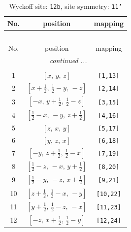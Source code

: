 \documentclass[fleqn,8pt]{jsarticle}
\begin{document}
\begin{longtable}{ccc}
\caption{Wyckoff site: {\tt 12b}, site symmetry: {\tt 11'}}
 \\
 \hline \hline
No. & position & mapping \\ \hline \endfirsthead

\multicolumn{2}{l}{\tablename\ \thetable{}} \\
 \hline \hline
No. & position & mapping \\ \hline \endhead

 \hline \hline
\multicolumn{2}{r}{\footnotesize\it continued ...} \\ \endfoot

 \hline \hline
\multicolumn{2}{r}{} \\ \endlastfoot

1 & $\left[ x,\, y,\, z \right]$ & {\tt [1,13]} \\ \hline
2 & $\left[ x + \frac{1}{2},\, \frac{1}{2} - y,\, - z \right]$ & {\tt [2,14]} \\ \hline
3 & $\left[ - x,\, y + \frac{1}{2},\, \frac{1}{2} - z \right]$ & {\tt [3,15]} \\ \hline
4 & $\left[ \frac{1}{2} - x,\, - y,\, z + \frac{1}{2} \right]$ & {\tt [4,16]} \\ \hline
5 & $\left[ z,\, x,\, y \right]$ & {\tt [5,17]} \\ \hline
6 & $\left[ y,\, z,\, x \right]$ & {\tt [6,18]} \\ \hline
7 & $\left[ - y,\, z + \frac{1}{2},\, \frac{1}{2} - x \right]$ & {\tt [7,19]} \\ \hline
8 & $\left[ \frac{1}{2} - z,\, - x,\, y + \frac{1}{2} \right]$ & {\tt [8,20]} \\ \hline
9 & $\left[ \frac{1}{2} - y,\, - z,\, x + \frac{1}{2} \right]$ & {\tt [9,21]} \\ \hline
10 & $\left[ z + \frac{1}{2},\, \frac{1}{2} - x,\, - y \right]$ & {\tt [10,22]} \\ \hline
11 & $\left[ y + \frac{1}{2},\, \frac{1}{2} - z,\, - x \right]$ & {\tt [11,23]} \\ \hline
12 & $\left[ - z,\, x + \frac{1}{2},\, \frac{1}{2} - y \right]$ & {\tt [12,24]} \\
\end{longtable}
\end{document}
